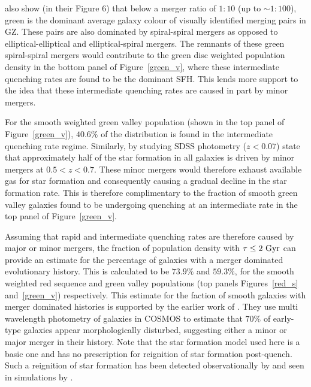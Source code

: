  \citet{Darg10a} also show (in their Figure 6) that below a merger ratio of $1:10$ (up to $\sim 1:100$), green is the dominant average galaxy colour of visually identified merging pairs in GZ. These pairs are also dominated by spiral-spiral mergers as opposed to elliptical-elliptical and elliptical-spiral mergers. The remnants of these green spiral-spiral mergers would contribute to the green disc weighted population density in the bottom panel of Figure~\ref{green_v}, where these intermediate quenching rates are found to be the dominant SFH. This lends more support to the idea that these intermediate quenching rates are caused in part by minor mergers. 

For the smooth weighted green valley population (shown in the top panel of Figure~\ref{green_v}), $40.6\%$ of the distribution is found in the intermediate quenching rate regime. Similarly, \citet{kaviraj14a, kaviraj14b} by studying SDSS photometry ($z<0.07$) state that approximately half of the star formation in all galaxies is driven by minor mergers at $0.5 < z < 0.7$. These minor mergers would therefore exhaust available gas for star formation and consequently causing a gradual decline in the star formation rate. This is therefore complimentary to the fraction of smooth green valley galaxies found to be undergoing quenching at an intermediate rate in the top panel of Figure~\ref{green_v}.

Assuming that rapid and intermediate quenching rates are therefore caused by major or minor mergers, the fraction of population density with $\tau \leq 2~\rm{Gyr}$ can provide an estimate for the percentage of galaxies with a merger dominated evolutionary history.  This is calculated to be $73.9\%$ and $59.3\%$, for the smooth weighted red sequence and green valley populations (top panels Figures~\ref{red_s} and~\ref{green_v}) respectively. This estimate for the faction of smooth galaxies with merger dominated histories is supported by the earlier work of \cite{kaviraj11}. They use multi wavelength photometry of galaxies in COSMOS \citep{Scoville07} to estimate that $70\%$ of early-type galaxies appear morphologically disturbed, suggesting either a minor or major merger in their history. Note that the star formation model used here is a basic one and has no prescription for reignition of star formation post-quench. Such a reignition of star formation has been detected observationally by \cite{kaviraj11} and seen in simulations by \cite{pontzen16}.


